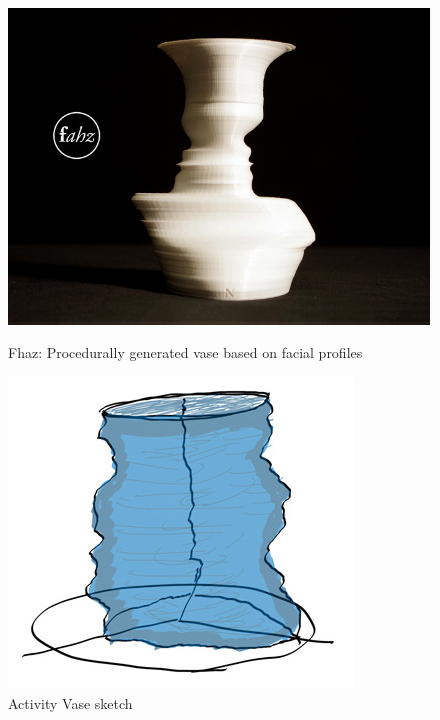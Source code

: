 \documentclass[../medieninformatik-arbeit.tex]{subfiles}
\begin{document}
\begin{figure}[h]
\centering
\begin{minipage}{.45\textwidth}
\centering
	\includegraphics[width=\linewidth]{Prototype/img/fhaz}
	\caption{Fhaz: Procedurally generated vase based on facial profiles\ \cite{fahz}}
	\label{fig:fhaz}
\end{minipage}
\begin{minipage}{.45\textwidth}
\centering
  \includegraphics[width=0.75\linewidth]{Prototype/img/ActivityVase_detail}
  \caption{Activity Vase sketch}
  \label{fig:activityvase}
\end{minipage}
\end{figure}
\end{document}
